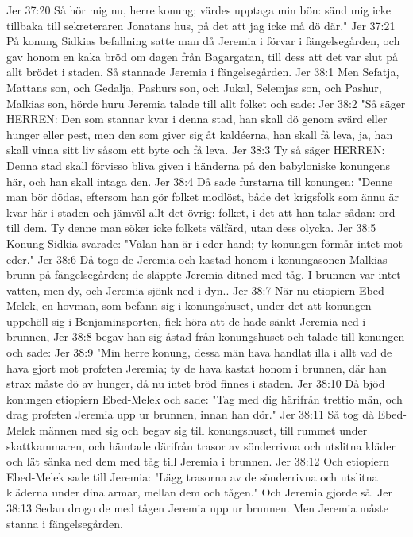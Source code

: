 Jer 37:20  Så hör mig nu, herre konung; värdes upptaga min bön: sänd mig icke tillbaka till sekreteraren Jonatans hus, på det att jag icke må dö där."
Jer 37:21  På konung Sidkias befallning satte man då Jeremia i förvar i fängelsegården, och gav honom en kaka bröd om dagen från Bagargatan, till dess att det var slut på allt brödet i staden. Så stannade Jeremia i fängelsegården.
Jer 38:1  Men Sefatja, Mattans son, och Gedalja, Pashurs son, och Jukal, Selemjas son, och Pashur, Malkias son, hörde huru Jeremia talade till allt folket och sade:
Jer 38:2  "Så säger HERREN: Den som stannar kvar i denna stad, han skall dö genom svärd eller hunger eller pest, men den som giver sig åt kaldéerna, han skall få leva, ja, han skall vinna sitt liv såsom ett byte och få leva.
Jer 38:3  Ty så säger HERREN: Denna stad skall förvisso bliva given i händerna på den babyloniske konungens här, och han skall intaga den.
Jer 38:4  Då sade furstarna till konungen: "Denne man bör dödas, eftersom han gör folket modlöst, både det krigsfolk som ännu är kvar här i staden och jämväl allt det övrig: folket, i det att han talar sådan: ord till dem. Ty denne man söker icke folkets välfärd, utan dess olycka.
Jer 38:5  Konung Sidkia svarade: "Välan han är i eder hand; ty konungen förmår intet mot eder."
Jer 38:6  Då togo de Jeremia och kastad honom i konungasonen Malkias brunn på fängelsegården; de släppte Jeremia ditned med tåg. I brunnen var intet vatten, men dy, och Jeremia sjönk ned i dyn..
Jer 38:7  När nu etiopiern Ebed-Melek, en hovman, som befann sig i konungshuset, under det att konungen uppehöll sig i Benjaminsporten, fick höra att de hade sänkt Jeremia ned i brunnen,
Jer 38:8  begav han sig åstad från konungshuset och talade till konungen och sade:
Jer 38:9  "Min herre konung, dessa män hava handlat illa i allt vad de hava gjort mot profeten Jeremia; ty de hava kastat honom i brunnen, där han strax måste dö av hunger, då nu intet bröd finnes i staden.
Jer 38:10  Då bjöd konungen etiopiern Ebed-Melek och sade: "Tag med dig härifrån trettio män, och drag profeten Jeremia upp ur brunnen, innan han dör."
Jer 38:11  Så tog då Ebed-Melek männen med sig och begav sig till konungshuset, till rummet under skattkammaren, och hämtade därifrån trasor av sönderrivna och utslitna kläder och lät sänka ned dem med tåg till Jeremia i brunnen.
Jer 38:12  Och etiopiern Ebed-Melek sade till Jeremia: "Lägg trasorna av de sönderrivna och utslitna kläderna under dina armar, mellan dem och tågen." Och Jeremia gjorde så.
Jer 38:13  Sedan drogo de med tågen Jeremia upp ur brunnen. Men Jeremia måste stanna i fängelsegården.
